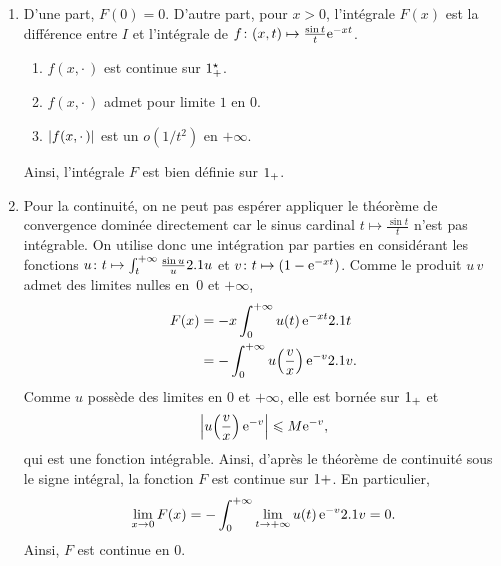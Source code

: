 \begin{solution}
\begin{reponses}

\item 
\begin{enumerate}
\item D'une part, $F(0) = 0$. D'autre part, pour $x > 0$, l'intégrale $F(x)$ est la différence entre $I$ et l'intégrale de $\fonctionligne[f]{(x, t)}{\frac{\sin t}{t} \e^{- x t}}$.
\begin{enumerate}[label=(\roman*)]
\item $f(x, \cdot\,)$ est continue sur $\Rpe$.
\item $f(x, \cdot\,)$ admet pour limite $1$ en $0$.
\item $\abs{f(x, \cdot\,)}$ est un $o(1/t^2)$ en $+\infty$.
\end{enumerate}
Ainsi, l'intégrale $F$ est bien définie sur $\Rp$.

\item Pour la continuité, on ne peut pas espérer appliquer le théorème de convergence dominée directement car le sinus cardinal $t \mapsto \frac{\sin t}{t}$ n'est pas intégrable. On utilise donc une intégration par parties en considérant les fonctions $\fonctionligne[u]{t}{\int_t^{+\infty} \frac{\sin u}{u} \d u}$ et $\fonctionligne[v]{t}{(1 - \e^{-x t})}$. Comme le produit $u\,v$ admet des limites nulles en~$0$ et $+\infty$, 
\begin{align*}
F(x) &= -x \int_{0}^{+\infty} u(t)\, \e^{- x t} \d t \\
&= -\int_0^{+\infty} u\mathopen{}\left(\frac{v}{x}\right) \e^{-v} \d v.
\end{align*}
Comme $u$ possède des limites en $0$ et $+\infty$, elle est bornée sur $\R_+$ et
\[
\abs{u\mathopen{}\left(\frac{v}{x}\right) \e^{-v}} \leqslant M \e^{-v},
\]
qui est une fonction intégrable. Ainsi, d'après le théorème de continuité sous le signe intégral, la fonction $F$ est continue sur $\R+$. En particulier,
\[
\lim_{x\to0} F(x) = -\int_0^{+\infty} \lim_{t\to+\infty} u(t)\, \e^{-v} \d v = 0.
\]
Ainsi, $F$ est continue en $0$.


\end{enumerate}
\end{reponses}
\end{solution}
